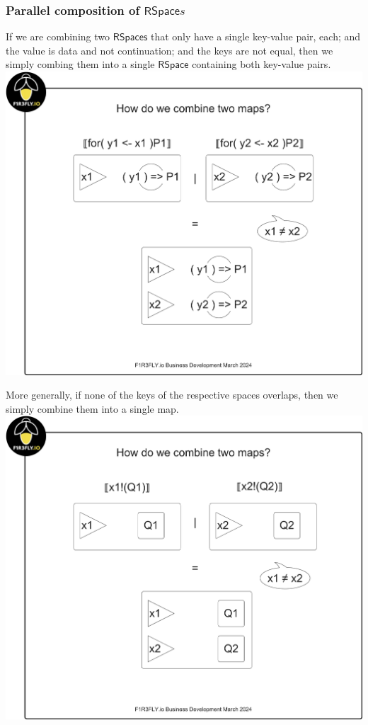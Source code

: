 \subsubsection{Parallel composition of $\mathsf{RSpace}s$}
If we are combining two $\mathsf{RSpaces}$ that only have a single
key-value pair, each; and the value is data and not continuation; and
the keys are not equal, then we simply combing them into a single
$\mathsf{RSpace}$ containing both key-value pairs. \\

\includegraphics[scale=0.25]{RHO20RSpaceSlide2.pdf}

More generally, if none of the keys of the respective spaces overlaps,
then we simply combine them into a single map. \\

\includegraphics[scale=0.25]{RHO20RSpaceSlide3.pdf}

